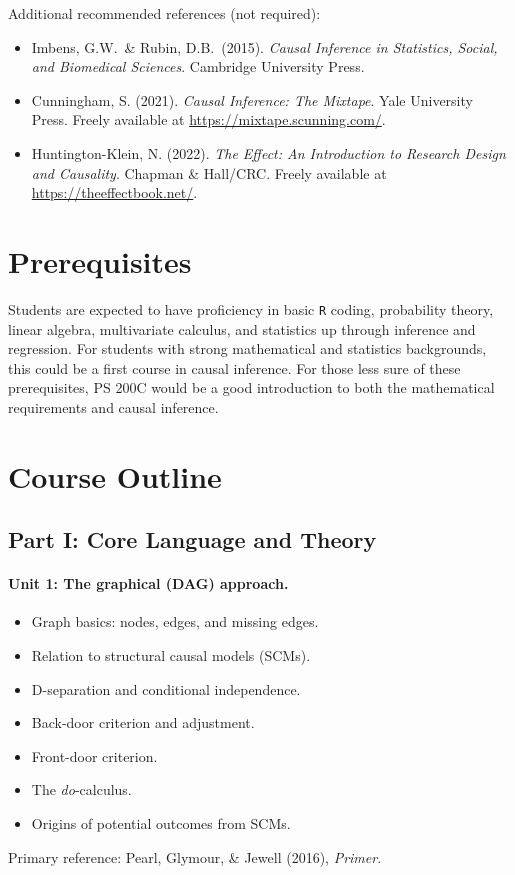 \documentclass[PS]{syllabus}
\begin{document}
\begin{syllabus}
Additional recommended references (not required):
\begin{itemize}
\item Imbens, G.W.\ \& Rubin, D.B.\ (2015). \textit{Causal Inference in Statistics, Social, and Biomedical Sciences}. Cambridge University Press.
\item Cunningham, S. (2021). \textit{Causal Inference: The Mixtape}. Yale University Press. Freely available at \url{https://mixtape.scunning.com/}.
\item Huntington-Klein, N. (2022). \textit{The Effect: An Introduction to Research Design and Causality}. Chapman \& Hall/CRC. Freely available at \url{https://theeffectbook.net/}.
\end{itemize}


\section{Prerequisites}

Students are expected to have proficiency in basic \texttt{R} coding, probability theory, linear algebra, multivariate calculus, and statistics up through inference and regression. For students with strong mathematical and statistics backgrounds, this could be a first course in causal inference. For those less sure of these prerequisites, PS 200C would be a good introduction to both the mathematical requirements and causal inference.


\section{Course Outline}

\subsection*{Part I: Core Language and Theory}

\paragraph{Unit 1: The graphical (DAG) approach.}
\begin{itemize}
\item Graph basics: nodes, edges, and missing edges.
\item Relation to structural causal models (SCMs).
\item D-separation and conditional independence.
\item Back-door criterion and adjustment.
\item Front-door criterion.
\item The \textit{do}-calculus.
\item Origins of potential outcomes from SCMs.
\end{itemize}
Primary reference: Pearl, Glymour, \& Jewell (2016), \textit{Primer}.


\end{syllabus}
\end{document}
